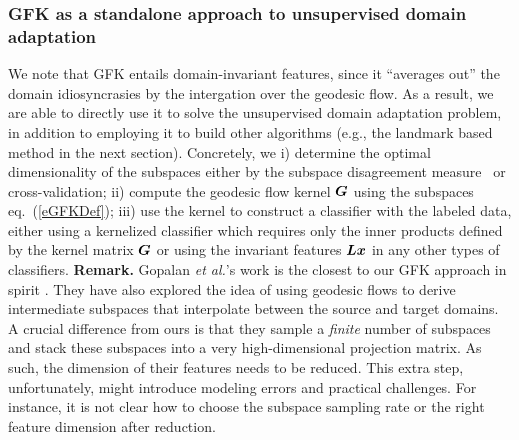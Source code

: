 \subsubsection{GFK as a standalone approach to unsupervised domain adaptation}
We note that GFK entails domain-invariant features, since it ``averages out'' the domain idiosyncrasies by the intergation over the geodesic flow. As a result, we are able to directly use it to solve the unsupervised domain adaptation problem, in addition to employing it to build other algorithms (e.g., the landmark based method in the next section). Concretely, we  i) determine the optimal dimensionality of the subspaces either by the subspace disagreement measure~\cite{GongCVPR12Geodesic} or cross-validation; ii) compute the geodesic flow kernel $\boldsymbol{G}$ using the subspaces eq.~(\ref{eGFKDef}); iii) use the kernel to construct a classifier with  the labeled data, either using a kernelized classifier which requires only the inner products defined by the kernel matrix $\boldsymbol{G}$ or using the invariant features $\boldsymbol{L}\boldsymbol{x}$ in any other types of classifiers.%
\newline \newline
{\bf Remark.} Gopalan \emph{et al.}'s work is the closest to our GFK approach in spirit \cite{gopalan2011domain}. They have also explored the idea of using geodesic flows to derive intermediate subspaces that interpolate between the source and target domains. A crucial difference from ours is that they sample a \emph{finite} number of subspaces and stack these subspaces into a very high-dimensional projection matrix. As such, the dimension of their features needs to be reduced. This extra step, unfortunately, might introduce modeling errors and practical challenges. For instance, it is not clear how to choose the subspace sampling rate or the right feature dimension after reduction. %

